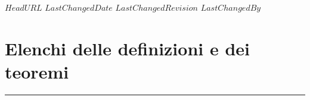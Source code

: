 \svnidlong
{$HeadURL$}
{$LastChangedDate$}
{$LastChangedRevision$}
{$LastChangedBy$}

\chapter{Elenchi delle definizioni e dei teoremi}
\nocite{*}
\begin{multicols}{2}
	\listofdefines
\end{multicols}
\begin{center}
\rule{4cm}{0.4pt}
\end{center}
\begin{multicols}{2}
	\listoftheoremas
\end{multicols}
\begin{comment}
\end{comment}